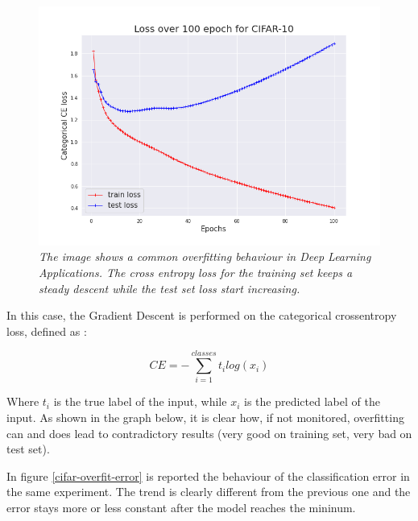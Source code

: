 \documentclass[11pt,a4paper]{article}
\begin{document}
\begin{figure}[H]
 \centering
 \includegraphics[scale=0.4]{../images/cifar10_100epochs_loss.png}
 \caption{\textit{The image shows a common overfitting behaviour in Deep Learning Applications. The cross entropy loss for the training set keeps a steady descent while the test set loss start increasing.}}  
 \label{cifar-overfit-loss}
\end{figure}

In this case, the Gradient Descent is performed on the categorical crossentropy loss, defined as : 

\begin{equation}
  CE = -\sum_{i=1}^{classes} t_i log(x_i)
\end{equation}

Where $t_i$ is the true label of the input, while $x_i$ is the predicted label of the input.
As shown in the graph below, it is clear how, if not monitored, overfitting can and does lead to contradictory results (very good on training set, very bad on test set). 


In figure \ref{cifar-overfit-error} is reported the behaviour of the classification error in the same experiment. The trend is clearly different from the previous one and the error stays more or less constant after the model reaches the mininum. 
\end{document}
